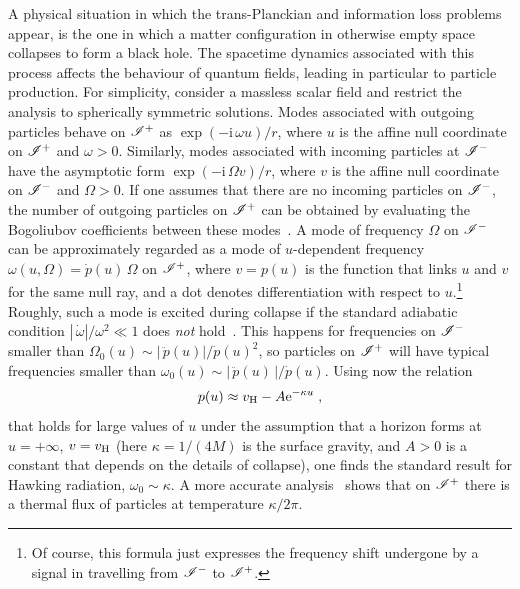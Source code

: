 \documentclass[12pt]{article}
\begin{document}
A physical situation in which the trans-Planckian and information loss problems appear, is the one in which a matter configuration in otherwise empty space collapses to form a black hole.  The spacetime dynamics associated with this process affects the behaviour of quantum fields, leading in particular to particle production.  For simplicity, consider a massless scalar field and restrict the analysis to spherically symmetric solutions.  Modes associated with outgoing particles behave  on $\mathscr{I}^+$ as $\exp\left(-\mathrm{i}\,\omega u\right)/r$, where $u$ is the affine null coordinate on $\mathscr{I}^{+}$ and $\omega>0$.  Similarly, modes associated with incoming particles at $\mathscr{I}^-$ have the asymptotic form $\exp\left(-\mathrm{i}\,\Omega v\right)/r$, where $v$ is the affine null coordinate on $\mathscr{I}^{-}$ and $\Omega>0$.  If one assumes that there are no incoming particles on $\mathscr{I}^-$, the number of outgoing particles on $\mathscr{I}^+$ can be obtained by evaluating the Bogoliubov coefficients between these modes~\cite{Hawking:1974sw, Birrell:1982ix, Novikov:1989sz}.  A mode of frequency $\Omega$ on $\mathscr{I}^-$ can be approximately regarded as a mode of $u$-dependent frequency $\omega(u,\Omega) = \dot{p}(u)\,\Omega $ on $\mathscr{I}^+$, where $v=p(u)$ is the function that links  $u$ and $v$ for the same null ray, and a dot denotes differentiation with respect to $u$.\footnote{Of course, this formula just expresses the frequency shift undergone by a signal in travelling from $\mathscr{I}^-$ to $\mathscr{I}^+$.}  Roughly, such a mode is excited during collapse if the standard adiabatic condition $|\,\dot{\omega}|/\omega^2\ll 1$ does \emph{not\/} hold~\cite{Barcelo:2007yk}.  This happens for frequencies on $\mathscr{I}^-$ smaller than $\Omega_0(u) \sim |\,\ddot{p}(u)|/\dot{p}(u)^2$, so particles on $\mathscr{I}^+$ will have typical frequencies smaller than $\omega_0(u)\sim |\,\ddot{p}(u)\,|/\dot{p}(u)$.  Using now the relation 
%
\begin{eqnarray}
p(u)\approx v_{\rm H} - A{\mathrm e}^{-\kappa u}\;,
\label{standard-p}
\end{eqnarray}
%
that holds for large values of $u$ under the assumption that a horizon forms at $u=+\infty$, $v=v_{\rm H}$ (here $\kappa=1/(4M)$ is the surface gravity, and $A>0$ is a constant that depends on the details of collapse), one finds the standard result for Hawking radiation, $\omega_0\sim \kappa$.  A more accurate analysis~\cite{Hawking:1974sw, Birrell:1982ix, Novikov:1989sz} shows that on $\mathscr{I}^+$ there is a thermal flux of particles at temperature $\kappa/2\pi$.
%
\end{document}
